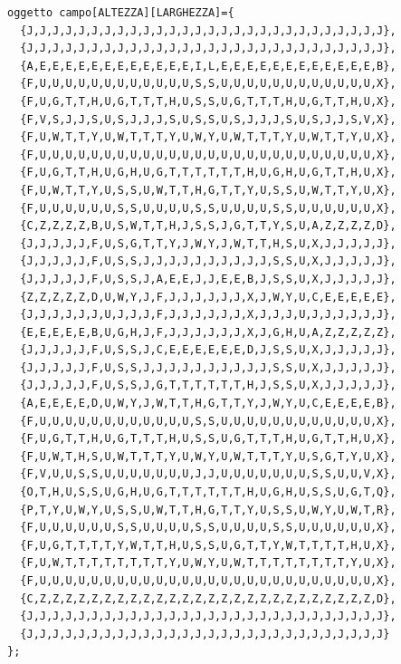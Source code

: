 \documentclass[8pt]{book}
\begin{document}
\newpage
  \begin{spacing}{0.9}
    \begin{small}
      \begin{tcolorbox}
\begin{verbatim}
oggetto campo[ALTEZZA][LARGHEZZA]={
  {J,J,J,J,J,J,J,J,J,J,J,J,J,J,J,J,J,J,J,J,J,J,J,J,J,J,J,J},
  {J,J,J,J,J,J,J,J,J,J,J,J,J,J,J,J,J,J,J,J,J,J,J,J,J,J,J,J},
  {A,E,E,E,E,E,E,E,E,E,E,E,E,I,L,E,E,E,E,E,E,E,E,E,E,E,E,B},
  {F,U,U,U,U,U,U,U,U,U,U,U,U,S,S,U,U,U,U,U,U,U,U,U,U,U,U,X},
  {F,U,G,T,T,H,U,G,T,T,T,H,U,S,S,U,G,T,T,T,H,U,G,T,T,H,U,X},
  {F,V,S,J,J,S,U,S,J,J,J,S,U,S,S,U,S,J,J,J,S,U,S,J,J,S,V,X},
  {F,U,W,T,T,Y,U,W,T,T,T,Y,U,W,Y,U,W,T,T,T,Y,U,W,T,T,Y,U,X},
  {F,U,U,U,U,U,U,U,U,U,U,U,U,U,U,U,U,U,U,U,U,U,U,U,U,U,U,X},
  {F,U,G,T,T,H,U,G,H,U,G,T,T,T,T,T,T,H,U,G,H,U,G,T,T,H,U,X},
  {F,U,W,T,T,Y,U,S,S,U,W,T,T,H,G,T,T,Y,U,S,S,U,W,T,T,Y,U,X},
  {F,U,U,U,U,U,U,S,S,U,U,U,U,S,S,U,U,U,U,S,S,U,U,U,U,U,U,X},
  {C,Z,Z,Z,Z,B,U,S,W,T,T,H,J,S,S,J,G,T,T,Y,S,U,A,Z,Z,Z,Z,D},
  {J,J,J,J,J,F,U,S,G,T,T,Y,J,W,Y,J,W,T,T,H,S,U,X,J,J,J,J,J},
  {J,J,J,J,J,F,U,S,S,J,J,J,J,J,J,J,J,J,J,S,S,U,X,J,J,J,J,J},
  {J,J,J,J,J,F,U,S,S,J,A,E,E,J,J,E,E,B,J,S,S,U,X,J,J,J,J,J},
  {Z,Z,Z,Z,Z,D,U,W,Y,J,F,J,J,J,J,J,J,X,J,W,Y,U,C,E,E,E,E,E},
  {J,J,J,J,J,J,U,J,J,J,F,J,J,J,J,J,J,X,J,J,J,U,J,J,J,J,J,J},
  {E,E,E,E,E,B,U,G,H,J,F,J,J,J,J,J,J,X,J,G,H,U,A,Z,Z,Z,Z,Z},
  {J,J,J,J,J,F,U,S,S,J,C,E,E,E,E,E,E,D,J,S,S,U,X,J,J,J,J,J},
  {J,J,J,J,J,F,U,S,S,J,J,J,J,J,J,J,J,J,J,S,S,U,X,J,J,J,J,J},
  {J,J,J,J,J,F,U,S,S,J,G,T,T,T,T,T,T,H,J,S,S,U,X,J,J,J,J,J},
  {A,E,E,E,E,D,U,W,Y,J,W,T,T,H,G,T,T,Y,J,W,Y,U,C,E,E,E,E,B},
  {F,U,U,U,U,U,U,U,U,U,U,U,U,S,S,U,U,U,U,U,U,U,U,U,U,U,U,X},
  {F,U,G,T,T,H,U,G,T,T,T,H,U,S,S,U,G,T,T,T,H,U,G,T,T,H,U,X},
  {F,U,W,T,H,S,U,W,T,T,T,Y,U,W,Y,U,W,T,T,T,Y,U,S,G,T,Y,U,X},
  {F,V,U,U,S,S,U,U,U,U,U,U,U,J,J,U,U,U,U,U,U,U,S,S,U,U,V,X},
  {O,T,H,U,S,S,U,G,H,U,G,T,T,T,T,T,T,H,U,G,H,U,S,S,U,G,T,Q},
  {P,T,Y,U,W,Y,U,S,S,U,W,T,T,H,G,T,T,Y,U,S,S,U,W,Y,U,W,T,R},
  {F,U,U,U,U,U,U,S,S,U,U,U,U,S,S,U,U,U,U,S,S,U,U,U,U,U,U,X},
  {F,U,G,T,T,T,T,Y,W,T,T,H,U,S,S,U,G,T,T,Y,W,T,T,T,T,H,U,X},
  {F,U,W,T,T,T,T,T,T,T,T,Y,U,W,Y,U,W,T,T,T,T,T,T,T,T,Y,U,X},
  {F,U,U,U,U,U,U,U,U,U,U,U,U,U,U,U,U,U,U,U,U,U,U,U,U,U,U,X},
  {C,Z,Z,Z,Z,Z,Z,Z,Z,Z,Z,Z,Z,Z,Z,Z,Z,Z,Z,Z,Z,Z,Z,Z,Z,Z,Z,D},
  {J,J,J,J,J,J,J,J,J,J,J,J,J,J,J,J,J,J,J,J,J,J,J,J,J,J,J,J},        
  {J,J,J,J,J,J,J,J,J,J,J,J,J,J,J,J,J,J,J,J,J,J,J,J,J,J,J,J}
};
\end{verbatim}
\end{tcolorbox}        
    \end{small}
  \end{spacing}      
              
\end{document}
